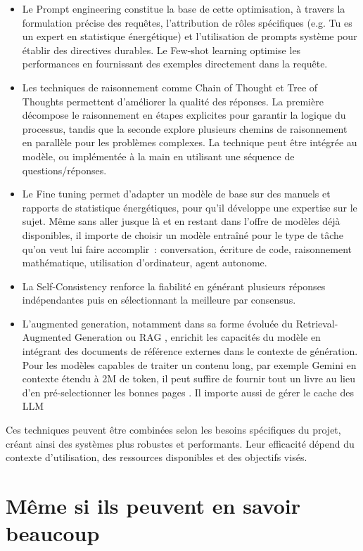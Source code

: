 \documentclass[a4paper,11pt]{report}
\providecommand{\tightlist}{\setlength{\itemsep}{0pt}\setlength{\parskip}{0pt}}
\begin{document}
\begin{itemize}
\tightlist
\item
  Le Prompt engineering constitue la base de cette optimisation, à travers la formulation précise des requêtes, l'attribution de rôles spécifiques (e.g. Tu es un expert en statistique énergétique) et l'utilisation de prompts système pour établir des directives durables. Le Few-shot learning optimise les performances en fournissant des exemples directement dans la requête.
\item
  Les techniques de raisonnement comme Chain of Thought et Tree of Thoughts permettent d'améliorer la qualité des réponses. La première décompose le raisonnement en étapes explicites pour garantir la logique du processus, tandis que la seconde explore plusieurs chemins de raisonnement en parallèle pour les problèmes complexes. La technique peut être intégrée au modèle, ou implémentée à la main en utilisant une séquence de questions/réponses.
\item
  Le Fine tuning permet d'adapter un modèle de base sur des manuels et rapports de statistique énergétiques, pour qu'il développe une expertise sur le sujet. Même sans aller jusque là et en restant dans l'offre de modèles déjà disponibles, il importe de choisir un modèle entraîné pour le type de tâche qu'on veut lui faire accomplir~: conversation, écriture de code, raisonnement mathématique, utilisation d'ordinateur, agent autonome.
\item
  La Self-Consistency renforce la fiabilité en générant plusieurs réponses indépendantes puis en sélectionnant la meilleure par consensus.
\item
  L'augmented generation, notamment dans sa forme évoluée du Retrieval-Augmented Generation ou RAG \citep{2U9Y8AJK} , enrichit les capacités du modèle en intégrant des documents de référence externes dans le contexte de génération. Pour les modèles capables de traiter un contenu long, par exemple Gemini en contexte étendu à 2M de token, il peut suffire de fournir tout un livre au lieu d'en pré-selectionner les bonnes pages \citep{JNKUDLN8}. Il importe aussi de gérer le cache des LLM \citep{Y95UBRJ9}
\end{itemize}

Ces techniques peuvent être combinées selon les besoins spécifiques du projet, créant ainsi des systèmes plus robustes et performants. Leur efficacité dépend du contexte d'utilisation, des ressources disponibles et des objectifs visés.

\chapter{Même si ils peuvent en savoir beaucoup}\label{muxeame-si-ils-peuvent-en-savoir-beaucoup}
\end{document}
